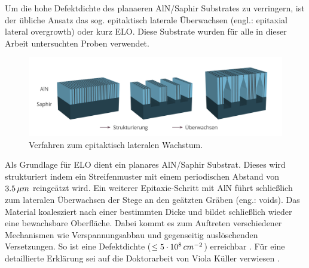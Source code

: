 Um die hohe Defektdichte des planaeren AlN/Saphir Substrates zu verringern, ist der übliche Ansatz das sog. epitaktisch laterale Überwachsen (engl.: epitaxial lateral overgrowth) oder kurz ELO. Diese Substrate wurden für alle in dieser Arbeit untersuchten Proben verwendet. 
\begin{figure}[h]
    \centering
    \begin{minipage}[t]{1\linewidth}
    \centering
    \includegraphics[width=1\linewidth]{Bilder/elostrukturierung.png}
    \end{minipage}%
    \caption{Verfahren zum epitaktisch lateralen Wachstum.}
     \label{fig:IQEthreadingdisl}
\end{figure}
\noindent
Als Grundlage für ELO dient ein planares AlN/Saphir Substrat. Dieses wird strukturiert indem ein Streifenmuster mit einem periodischen Abstand von $3.5 \thinspace \mu m$ reingeätzt wird. Ein weiterer Epitaxie-Schritt mit AlN führt schließlich zum lateralen Überwachsen der Stege an den geätzten Gräben (eng.: voids).
Das Material koalesziert nach einer bestimmten Dicke und bildet schließlich wieder eine bewachsbare Oberfläche. Dabei kommt es zum Auftreten verschiedener Mechanismen wie Verspannungsabbau und gegenseitig auslöschenden Versetzungen. So ist eine Defektdichte ($\leq 5 \cdot 10^8 \thinspace cm^{-2}$) erreichbar \cite{zeimeru} \cite{MOGILATENKO2014222} \cite{vkueller} \cite{IMURA2007257}. Für eine detaillierte Erklärung sei auf die Doktorarbeit von Viola Küller verwiesen \cite{vkueller}.
